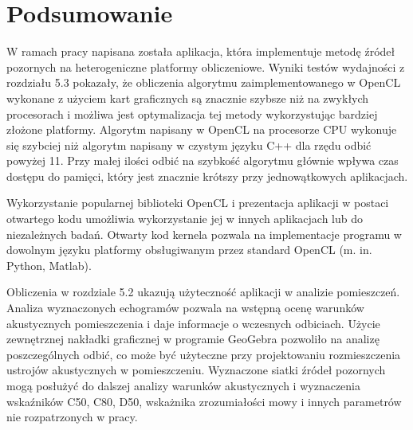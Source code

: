 \chapter{Podsumowanie}\label{cha:podsum}

W ramach pracy napisana została aplikacja, która implementuje metodę źródeł pozornych na heterogeniczne platformy obliczeniowe. Wyniki testów wydajności z rozdziału 5.3 pokazały, że obliczenia algorytmu zaimplementowanego w OpenCL wykonane z użyciem kart graficznych są znacznie szybsze niż na zwykłych procesorach i możliwa jest optymalizacja tej metody wykorzystując bardziej złożone platformy. Algorytm napisany w OpenCL na procesorze CPU wykonuje się szybciej niż algorytm napisany w czystym języku C++ dla rzędu odbić powyżej 11. Przy małej ilości odbić na szybkość algorytmu głównie wpływa czas dostępu do pamięci, który jest znacznie krótszy przy jednowątkowych aplikacjach.    

Wykorzystanie popularnej biblioteki OpenCL i prezentacja aplikacji w postaci otwartego kodu umożliwia wykorzystanie jej w innych aplikacjach  lub do niezależnych badań. Otwarty kod kernela pozwala na implementacje programu w dowolnym języku platformy obsługiwanym przez standard OpenCL (m. in. Python, Matlab).

Obliczenia w rozdziale 5.2 ukazują użyteczność aplikacji w analizie pomieszczeń. Analiza wyznaczonych echogramów pozwala na wstępną ocenę warunków akustycznych pomieszczenia i daje informacje o wczesnych odbiciach. Użycie zewnętrznej nakładki graficznej w programie GeoGebra pozwoliło na analizę poszczególnych odbić, co może być użyteczne przy projektowaniu rozmieszczenia ustrojów akustycznych w pomieszczeniu. Wyznaczone siatki źródeł pozornych mogą posłużyć do dalszej analizy warunków akustycznych i wyznaczenia wskaźników C50, C80, D50, wskażnika zrozumiałości mowy i innych parametrów nie rozpatrzonych w pracy.